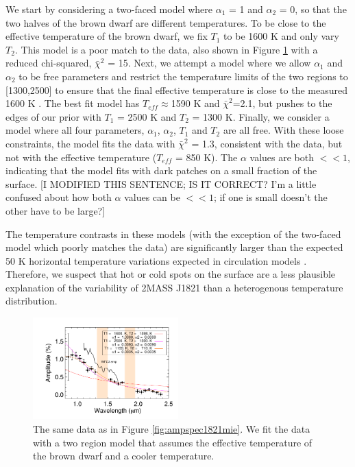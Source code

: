 \documentclass[twocolumn]{aastex6}
\begin{document}
We start by considering a two-faced model where $\alpha_1$ = 1 and $\alpha_2$ = 0, so that the two halves of the brown dwarf are different temperatures.
To be close to the effective temperature of the brown dwarf, we fix $T_1$ to be 1600 K and only vary $T_2$.
This model is a poor match to the data, also shown in Figure \ref{fig:ampspec1821tdiff} with a reduced chi-squared, $\bar{\chi}^2$ = 15.
Next, we attempt a model where we allow $\alpha_1$ and $\alpha_2$ to be free parameters and restrict the temperature limits of the two regions to [1300,2500] to ensure that the final effective temperature is close to the measured 1600 K \citep{gagne2015banyan7}.
The best fit model has $T_{eff} \approx $1590 K and $\bar{\chi}^2$=2.1, but pushes to the edges of our prior with $T_1$ = 2500 K and $T_2$ = 1300 K.
Finally, we consider a model where all four parameters, $\alpha_1$, $\alpha_2$, $T_1$ and $T_2$ are all free.
With these loose constraints, the model fits the data with $\bar{\chi}^2$ = 1.3, consistent with the data, but not with the effective temperature ($T_{eff}$ = 850 K).
The $\alpha$ values are both $<<1$, indicating that the model fits with dark patches on a small fraction of the surface. [I MODIFIED THIS SENTENCE; IS IT CORRECT? I'm a little confused about how both $\alpha$ values can be $<<1$; if one is small doesn't the other have to be large?]

The temperature contrasts in these models (with the exception of the two-faced model which poorly matches the data) are significantly larger than the expected 50 K horizontal temperature variations expected in circulation models \citep{showman2013bdgpDynamics}.
Therefore, we suspect that hot or cold spots on the surface are a less plausible explanation of the variability of 2MASS J1821 than a heterogenous temperature distribution.

\vspace{0.2in}
\begin{figure}
\begin{centering}
\includegraphics[width=0.5\textwidth]{amp_vs_wavl_j1821_t_diff.pdf}
\caption{The same data as in Figure \ref{fig:ampspec1821mie}. We fit the data with a two region model that assumes the effective temperature of the brown dwarf and a cooler temperature.}\label{fig:ampspec1821tdiff}
\end{centering}
\end{figure}
\end{document}

